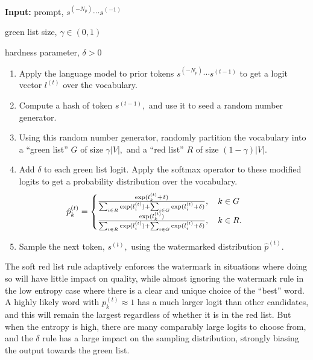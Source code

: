 \documentclass{article}
\theoremstyle{plain}
\theoremstyle{definition}
\theoremstyle{remark}
\begin{document}
\begin{algorithm}[ht]
   \caption{Text Generation with Soft Red List}
   \label{soft}
\begin{algorithmic}
\STATE \textbf{Input:} prompt, $s^{(-N_p)}\cdots s^{(-1)}$

\hspace{10.5mm}green list size, $\gamma \in (0,1)$ 

\hspace{10.5mm}hardness parameter, $\delta > 0$
 \STATE 
 \begin{enumerate}
\item Apply the language model to prior tokens $s^{(-N_p)}\cdots s^{(t-1)}$ to get a logit vector $l^{(t)}$ over the vocabulary.
\item Compute a hash of token $s^{(t-1)},$ and use it to seed a random number generator.
\item Using this random number generator, randomly partition  the vocabulary into a ``green list'' $G$ of size $\gamma |V|,$ and a ``red list'' $R$ of size $(1-\gamma)|V|$. 
\item Add $\delta$ to each green list logit.  Apply the softmax operator to these modified logits to get a probability distribution over the vocabulary.
 $$\hspace{-4mm}\hat p^{(t)}_k =
  \begin{cases}  \frac{ \exp(l^{(t)}_k+\delta)}{\sum_{i\in R} \exp(l^{(t)}_i)+\sum_{i\in G} \exp(l^{(t)}_i+\delta)}, \quad k\in G\\
  \frac{ \exp(l^{(t)}_k)}{\sum_{i\in R} \exp(l^{(t)}_i)+\sum_{i\in G} \exp(l^{(t)}_i+\delta)}, \quad k\in R. \label{logitboost}
  \end{cases}
$$
\item Sample the next token, $s^{(t)},$ using the watermarked distribution $\hat p^{(t)}.$  
\end{enumerate}
\ENDFOR
\end{algorithmic}
\end{algorithm}

 The soft red list rule adaptively enforces the watermark in situations where doing so will have little impact on quality, while almost ignoring the watermark rule in the low entropy case where there is a clear and unique choice of the ``best'' word.  A highly likely word with $p^{(t)}_k \approx 1$ has a much larger logit than other candidates, and this will remain the largest regardless of whether it is in the red list.  But when the entropy is high, there are many comparably large logits to choose from, and the $\delta$ rule has a large impact on the sampling distribution, strongly biasing the output towards the green list. 
\end{document}
